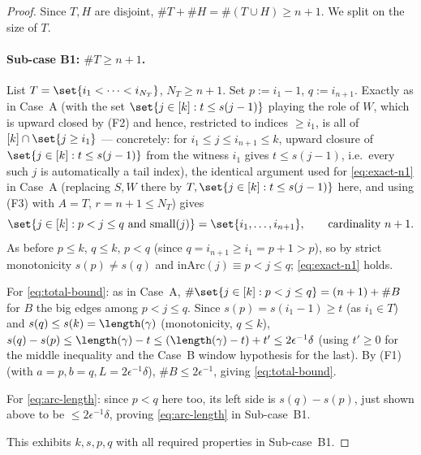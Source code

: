 \begin{proof}
  Since $T,H$ are disjoint, $\#T+\#H=\#(T\cup H)\ge n+1$. We split on the size of $T$.

  \paragraph{Sub-case B1: $\#T\ge n+1$.} List $T=\set{i_1<\dots<i_{N_T}}$, $N_T\ge n+1$. Set
  $p:=i_1-1$, $q:=i_{n+1}$. Exactly as in Case~A (with the set $\set{j\in[k]:t\le s(j-1)}$ playing
  the role of $W$, which is upward closed by (F2) and hence, restricted to indices $\ge i_1$, is
  all of $[k]\cap\set{j\ge i_1}$ — concretely: for $i_1\le j\le i_{n+1}\le k$, upward closure of
  $\set{j\in[k]:t\le s(j-1)}$ from the witness $i_1$ gives $t\le s(j-1)$, i.e.\ every such $j$ is
  automatically a tail index), the identical argument used for \eqref{eq:exact-n1} in Case~A
  (replacing $S,W$ there by $T,\set{j\in[k]:t\le s(j-1)}$ here, and using (F3) with $A=T$,
  $r=n+1\le N_T$) gives
  \[
    \set{j\in[k] : p<j\le q \text{ and } \mathrm{small}(j)} = \set{i_1,\dots,i_{n+1}}
    , \qquad \text{cardinality } n+1 .
  \]
  As before $p\le k$, $q\le k$, $p<q$ (since $q=i_{n+1}\ge i_1=p+1>p$), so by strict monotonicity
  $s(p)\ne s(q)$ and $\mathrm{inArc}(j)\equiv p<j\le q$; \eqref{eq:exact-n1} holds.

  For \eqref{eq:total-bound}: as in Case~A, $\#\set{j\in[k]:p<j\le q} = (n+1)+\#B$ for $B$ the
  big edges among $p<j\le q$. Since $s(p)=s(i_1-1)\ge t$ (as $i_1\in T$) and $s(q)\le s(k)=
  \length(\gamma)$ (monotonicity, $q\le k$), $s(q)-s(p) \le \length(\gamma)-t \le
  (\length(\gamma)-t)+t' \le 2\epsilon^{-1}\delta$ (using $t'\ge0$ for the middle inequality and the
  Case~B window hypothesis for the last). By (F1) (with $a=p,b=q,L=2\epsilon^{-1}\delta$),
  $\#B\le2\epsilon^{-1}$, giving \eqref{eq:total-bound}.

  For \eqref{eq:arc-length}: since $p<q$ here too, its left side is $s(q)-s(p)$, just shown above
  to be $\le2\epsilon^{-1}\delta$, proving \eqref{eq:arc-length} in Sub-case~B1.

  This exhibits $k,s,p,q$ with all required properties in Sub-case~B1.


\end{proof}
